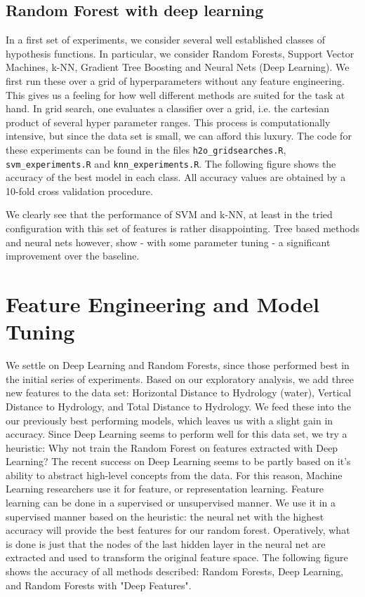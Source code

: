 \documentclass[paper=a4, fontsize=11pt]{scrartcl}
\numberwithin{equation}{section}
\numberwithin{figure}{section}
\numberwithin{table}{section}
\begin{document}

\subsection{Random Forest with deep learning}

In a first set of experiments, we consider several well established classes of hypothesis functions. In particular, we consider Random Forests, Support Vector Machines, k-NN,  Gradient Tree Boosting and Neural Nets (Deep Learning). 
We first run these over a grid of hyperparameters without any feature engineering. This gives us a feeling for how well different methods are suited for the task at hand. In grid search, one evaluates a classifier over a grid, i.e. the cartesian product of several hyper parameter ranges. This process is computationally intensive, but since the data set is small, we can afford this luxury. The code for these experiments can be found in the files \lstinline{h2o_gridsearches.R}, \lstinline{svm_experiments.R} and \lstinline{knn_experiments.R}. The following figure shows the accuracy of the best model in each class. All accuracy values are obtained by a 10-fold cross validation procedure. 

We clearly see that the performance of SVM and k-NN, at least in the tried configuration with this set of features is rather disappointing. Tree based methods  and neural nets however, show - with some parameter tuning - a significant improvement over the baseline. 




\section{Feature Engineering and Model Tuning}
We settle on Deep Learning and Random Forests, since those performed best in the initial series of experiments. Based on our exploratory analysis, we add three new features to the data set: Horizontal Distance to Hydrology (water), Vertical Distance to Hydrology, and Total Distance to Hydrology. We feed these into the our previously best performing models, which leaves us with a slight gain in accuracy. 
Since Deep Learning seems to perform well for this data set, we try a heuristic: Why not train the Random Forest on features extracted with Deep Learning? The recent success on Deep Learning seems to be partly based on it's ability to abstract high-level concepts from the data. For this reason, Machine Learning researchers use it for feature, or representation learning. Feature learning can be done in a supervised or unsupervised manner. We use it in a supervised manner based on the heuristic: the neural net with the highest accuracy will provide the best features for our random forest. Operatively, what is done is just that the nodes of the last hidden layer in the neural net are extracted and used to transform the original feature space. The following figure shows the accuracy of all methods described: Random Forests, Deep Learning, and Random Forests with "Deep Features". 
\end{document}
